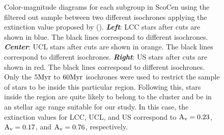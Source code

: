 \begin{figure}[!ht]
\centering
\caption{\scriptsize{Color-magnitude diagrams for each subgroup in ScoCen using the filtered out sample between two different isochrones applying the extinction value proposed by  (\citeyear{1989A&A...216...44D}). \textit{\textbf{Left}}: LCC stars after cuts are shown in blue. The black lines correspond to different isochrones. \textit{\textbf{Center}}: UCL stars after cuts are shown in orange. The black lines correspond to different isochrones. \textit{\textbf{Right}}: US stars after cuts are shown in red. The black lines correspond to different isochrones. Only the $5 \textnormal{Myr}$ to $60 \textnormal{Myr}$ isochrones were used to restrict the sample of stars to be inside this particular region. Following this, stars inside the region are quite likely to belong to the cluster and be in an stellar age range suitable for our study. In this case, the extinction values for LCC, UCL, and US correspond to $\textnormal{A}_\textnormal{v} = 0.23$, $\textnormal{A}_\textnormal{v} = 0.17$, and $\textnormal{A}_\textnormal{v} = 0.76$, respectively.}}
\label{fig:DR2_Selection}
\end{figure}

